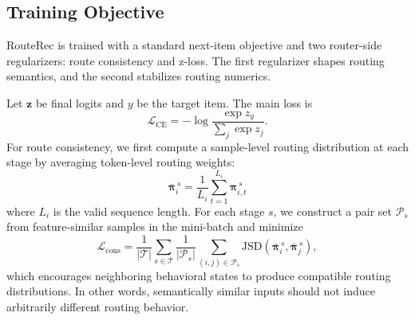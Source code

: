 \documentclass[sigconf,review,anonymous]{acmart}
\begin{document}
\subsection{Training Objective}
\label{sec:training-objective}

RouteRec is trained with a standard next-item objective and two router-side regularizers: route consistency and z-loss. The first regularizer shapes routing semantics, and the second stabilizes routing numerics.

Let $\mathbf{z}$ be final logits and $y$ be the target item. The main loss is
\[
\mathcal{L}_{\mathrm{CE}}
=
-\log \frac{\exp z_y}{\sum_{j}\exp z_j}.
\]
For route consistency, we first compute a sample-level routing distribution at each stage by averaging token-level routing weights:
\[
\bar{\boldsymbol{\pi}}_i^{\,s}
=
\frac{1}{L_i}\sum_{t=1}^{L_i}\boldsymbol{\pi}_{i,t}^{\,s}
\]
where $L_i$ is the valid sequence length. For each stage $s$, we construct a pair set $\mathcal{P}_s$ from feature-similar samples in the mini-batch and minimize
\[
\mathcal{L}_{\mathrm{cons}}
=
\frac{1}{|\mathcal{T}|}
\sum_{s \in \mathcal{T}}
\frac{1}{|\mathcal{P}_s|}
\sum_{(i,j)\in \mathcal{P}_s}
\mathrm{JSD}\!\left(\bar{\boldsymbol{\pi}}_i^{\,s}, \bar{\boldsymbol{\pi}}_j^{\,s}\right),
\]
which encourages neighboring behavioral states to produce compatible routing distributions. In other words, semantically similar inputs should not induce arbitrarily different routing behavior.
\end{document}
